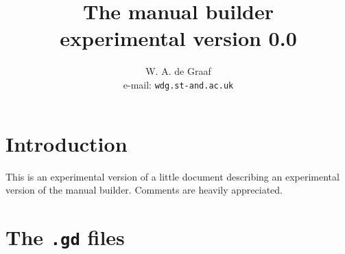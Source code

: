 \documentclass[a4wide]{article}
\begin{document}
\title{The manual builder\\
experimental version 0.0}
\author{W. A. de Graaf\\
e-mail: {\tt wdg\@@dcs.st-and.ac.uk}}
\date{}
\maketitle

\section{Introduction}
This is an experimental version of a little document describing an
experimental version of the manual builder. Comments are heavily appreciated.

\section{The {\tt .gd} files}
\end{document}
